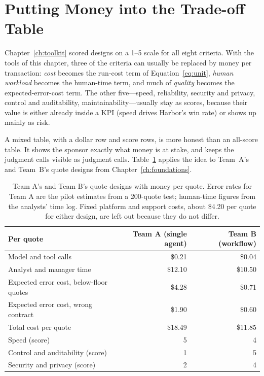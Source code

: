 
\section{Putting Money into the Trade-off Table}
\label{sec:money-tradeoff}

Chapter~\ref{ch:toolkit} scored designs on a 1--5 scale for all eight criteria. With the tools of this chapter, three of the criteria can usually be replaced by money per transaction: \emph{cost} becomes the run-cost term of Equation~\eqref{eq:unit}, \emph{human workload} becomes the human-time term, and much of \emph{quality} becomes the expected-error-cost term. The other five---speed, reliability, security and privacy, control and auditability, maintainability---usually stay as scores, because their value is either already inside a KPI (speed drives Harbor's win rate) or shows up mainly as risk.

A mixed table, with a dollar row and score rows, is more honest than an all-score table. It shows the sponsor exactly what money is at stake, and keeps the judgment calls visible as judgment calls. Table~\ref{tab:money} applies the idea to Team~A's and Team~B's quote designs from Chapter~\ref{ch:foundations}.

\begin{table}[htbp]
\centering
\small
\caption{Team A's and Team B's quote designs with money per quote. Error rates for Team A are the pilot estimates from a 200-quote test; human-time figures from the analysts' time log. Fixed platform and support costs, about \$4.20 per quote for either design, are left out because they do not differ.}
\label{tab:money}
\begin{tabular}{@{}lrr@{}}
\toprule
Per quote & Team A (single agent) & Team B (workflow) \\
\midrule
Model and tool calls & \$0.21 & \$0.04 \\
Analyst and manager time & \$12.10 & \$10.50 \\
Expected error cost, below-floor quotes & \$4.28 & \$0.71 \\
Expected error cost, wrong contract & \$1.90 & \$0.60 \\
\midrule
Total cost per quote & \$18.49 & \$11.85 \\
\midrule
Speed (score) & 5 & 4 \\
Control and auditability (score) & 1 & 5 \\
Security and privacy (score) & 2 & 4 \\
\bottomrule
\end{tabular}
\end{table}

